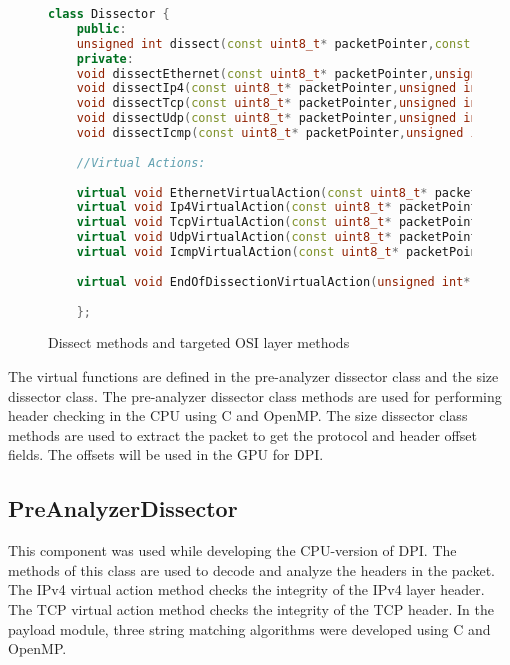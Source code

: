\begin{figure}[H]
	\centering
	\begin{lstlisting}[frame=none,language=C++] 
	class Dissector {
	public:
	unsigned int dissect(const uint8_t* packetPointer,const struct pcap_pkthdr* hdr,const int deviceDataLinkInfo,void* user);
	private:
	void dissectEthernet(const uint8_t* packetPointer,unsigned int * totalHeaderLength,const struct pcap_pkthdr* hdr,void* user);
	void dissectIp4(const uint8_t* packetPointer,unsigned int * totalHeaderLength,const struct pcap_pkthdr* hdr,void* user);
	void dissectTcp(const uint8_t* packetPointer,unsigned int * totalHeaderLength,const struct pcap_pkthdr* hdr,void* user);
	void dissectUdp(const uint8_t* packetPointer,unsigned int * totalHeaderLength,const struct pcap_pkthdr* hdr,void* user);
	void dissectIcmp(const uint8_t* packetPointer,unsigned int * totalHeaderLength,const struct pcap_pkthdr* hdr,void* user);
	
	//Virtual Actions:
	
	virtual void EthernetVirtualAction(const uint8_t* packetPointer,unsigned int* totalHeaderLength,const struct pcap_pkthdr* hdr,Ethernet2Header* header,void* user)=0;
	virtual void Ip4VirtualAction(const uint8_t* packetPointer,unsigned int* totalHeaderLength,const struct pcap_pkthdr* hdr,Ip4Header* header,void* user)=0;
	virtual void TcpVirtualAction(const uint8_t* packetPointer,unsigned int* totalHeaderLength,const struct pcap_pkthdr* hdr,TcpHeader* header,void* user)=0;
	virtual void UdpVirtualAction(const uint8_t* packetPointer,unsigned int* totalHeaderLength,const struct pcap_pkthdr* hdr,UdpHeader* header,void* user)=0;
	virtual void IcmpVirtualAction(const uint8_t* packetPointer,unsigned int* totalHeaderLength,const struct pcap_pkthdr* hdr,IcmpHeader* header,void* user)=0;
	
	virtual void EndOfDissectionVirtualAction(unsigned int* totalHeaderLength,const struct pcap_pkthdr* hdr,void* user)=0;
	
	};
	\end{lstlisting}
	\caption[Dissect methods and targeted OSI layer methods]{Dissect methods and targeted OSI layer methods \cite{bib3}}
	\label{fig:calldissectmethods}
\end{figure}
\squeezeup

The virtual functions are defined in the pre-analyzer dissector class and the size dissector class. The pre-analyzer dissector class methods are used for performing header checking in the CPU using C and OpenMP. The size dissector class methods are used to extract the packet to get the protocol and header offset fields. The offsets will be used in the GPU for DPI.

\subsection{PreAnalyzerDissector}
This component was used while developing the CPU-version of DPI. The methods of this class are used to decode and analyze the headers in the packet. The IPv4 virtual action method checks the integrity of the IPv4 layer header. The TCP virtual action method checks the integrity of the TCP header. In the payload module, three string matching algorithms were developed using C and OpenMP. 